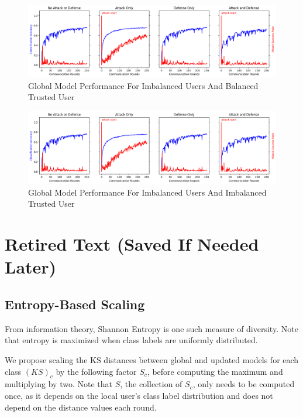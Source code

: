 \documentclass{article} %
\begin{document}
\begin{figure}[H]
    \centering
    \includegraphics[width=\textwidth]{01_trusted/centralized/alpha1--alpha_val1/visuals/accuracy--n_malicious1--m_start1.png}
    \caption{Global Model Performance For Imbalanced Users And Balanced Trusted User}
    \label{fig:centralized--alpha1--alpha_val10000--accuracy--n_malicious1--m_start1}
\end{figure} 

\begin{figure}[H]
    \centering
    \includegraphics[width=\textwidth]{01_trusted/centralized/alpha1--alpha_val1/visuals/accuracy--n_malicious1--m_start1.png}
    \caption{Global Model Performance For Imbalanced Users And Imbalanced Trusted User}
    \label{fig:centralized--alpha1--alpha_val1--accuracy--n_malicious1--m_start1}
\end{figure} 


% 
\section{Retired Text (Saved If Needed Later)}

\subsection{Entropy-Based Scaling}
From information theory, Shannon Entropy is one such measure of diversity. Note that entropy is maximized when class labels are uniformly distributed. 

We propose scaling the KS distances between global and updated models for each class $(KS)_c$ by the following factor $S_c$, before computing the maximum and multiplying by two. Note that $S$, the collection of $S_c$, only needs to be computed once, as it depends on the local user's class label distribution and does not depend on the distance values each round.
\end{document}
